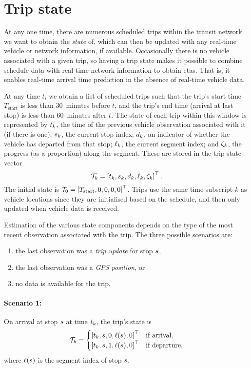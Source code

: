 \section{Trip state}
\label{sec:trip_state}

At any one time, there are numerous scheduled trips within the transit network we want to obtain the \emph{state} of, which can then be updated with any real-time vehicle or network information, if available. Occasionally there is no vehicle associated with a given trip, so having a trip state makes it possible to combine schedule data with real-time network information to obtain \glspl{eta}. That is, it enables real-time arrival time prediction in the absence of real-time vehicle data.


At any time $t$, we obtain a list of scheduled trips such that the trip's start time $T_\text{start}$ is less than 30~minutes before $t$, and the trip's end time (arrival at last stop) is less than 60~minutes after $t$. The state of each trip within this window is represented by $t_k$, the time of the previous vehicle observation associated with it (if there is one); $s_k$, the current stop index; $d_k$, an indicator of whether the vehicle has departed from that stop; $\ell_k$, the current segment index; and $\zeta_k$, the progress (as a proportion) along the segment. These are stored in the trip state vector
\begin{equation}
\label{eq:trip_state}
\mathcal{T}_k = \left[t_k, s_k, d_k, \ell_k, \zeta_k\right]^\top.
\end{equation}
The initial state is $\mathcal{T}_0 = \left[T_\text{start},0,0,0,0\right]^\top$. Trips use the same time subscript $k$ as vehicle locations since they are initialised based on the schedule, and then only updated when vehicle data is received.

Estimation of the various state components depends on the type of the most recent observation associated with the trip. The three possible scenarios are:
\begin{enumerate}
\item the last observation was a \emph{trip update} for stop $s$,
\item the last observation was a \emph{GPS position}, or
\item no data is available for the trip.
\end{enumerate}


\paragraph{Scenario 1:}
On arrival at stop $s$ at time $t_k$, the trip's state is
\begin{equation}
\label{eq:trip_state_tu}
\mathcal{T}_k =
\begin{cases}
\left[t_k, s, 0, \ell(s), 0\right]^\top & \text{if arrival}, \\
\left[t_k, s, 1, \ell(s), 0\right]^\top & \text{if departure}.
\end{cases}
\end{equation}
where $\ell(s)$ is the segment index of stop $s$.



